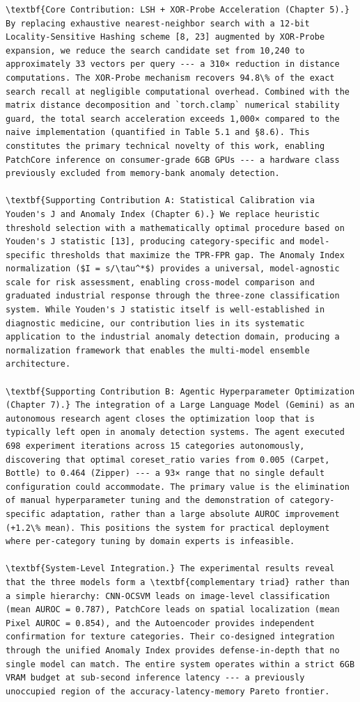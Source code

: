 \documentclass[12pt,a4paper,oneside]{report}
\begin{document}
\begin{verbatim}
\textbf{Core Contribution: LSH + XOR-Probe Acceleration (Chapter 5).} By replacing exhaustive nearest-neighbor search with a 12-bit Locality-Sensitive Hashing scheme [8, 23] augmented by XOR-Probe expansion, we reduce the search candidate set from 10,240 to approximately 33 vectors per query --- a 310× reduction in distance computations. The XOR-Probe mechanism recovers 94.8\% of the exact search recall at negligible computational overhead. Combined with the matrix distance decomposition and `torch.clamp` numerical stability guard, the total search acceleration exceeds 1,000× compared to the naive implementation (quantified in Table 5.1 and §8.6). This constitutes the primary technical novelty of this work, enabling PatchCore inference on consumer-grade 6GB GPUs --- a hardware class previously excluded from memory-bank anomaly detection.

\textbf{Supporting Contribution A: Statistical Calibration via Youden's J and Anomaly Index (Chapter 6).} We replace heuristic threshold selection with a mathematically optimal procedure based on Youden's J statistic [13], producing category-specific and model-specific thresholds that maximize the TPR-FPR gap. The Anomaly Index normalization ($I = s/\tau^*$) provides a universal, model-agnostic scale for risk assessment, enabling cross-model comparison and graduated industrial response through the three-zone classification system. While Youden's J statistic itself is well-established in diagnostic medicine, our contribution lies in its systematic application to the industrial anomaly detection domain, producing a normalization framework that enables the multi-model ensemble architecture.

\textbf{Supporting Contribution B: Agentic Hyperparameter Optimization (Chapter 7).} The integration of a Large Language Model (Gemini) as an autonomous research agent closes the optimization loop that is typically left open in anomaly detection systems. The agent executed 698 experiment iterations across 15 categories autonomously, discovering that optimal coreset_ratio varies from 0.005 (Carpet, Bottle) to 0.464 (Zipper) --- a 93× range that no single default configuration could accommodate. The primary value is the elimination of manual hyperparameter tuning and the demonstration of category-specific adaptation, rather than a large absolute AUROC improvement (+1.2\% mean). This positions the system for practical deployment where per-category tuning by domain experts is infeasible.

\textbf{System-Level Integration.} The experimental results reveal that the three models form a \textbf{complementary triad} rather than a simple hierarchy: CNN-OCSVM leads on image-level classification (mean AUROC = 0.787), PatchCore leads on spatial localization (mean Pixel AUROC = 0.854), and the Autoencoder provides independent confirmation for texture categories. Their co-designed integration through the unified Anomaly Index provides defense-in-depth that no single model can match. The entire system operates within a strict 6GB VRAM budget at sub-second inference latency --- a previously unoccupied region of the accuracy-latency-memory Pareto frontier.



\end{verbatim}
\end{document}
